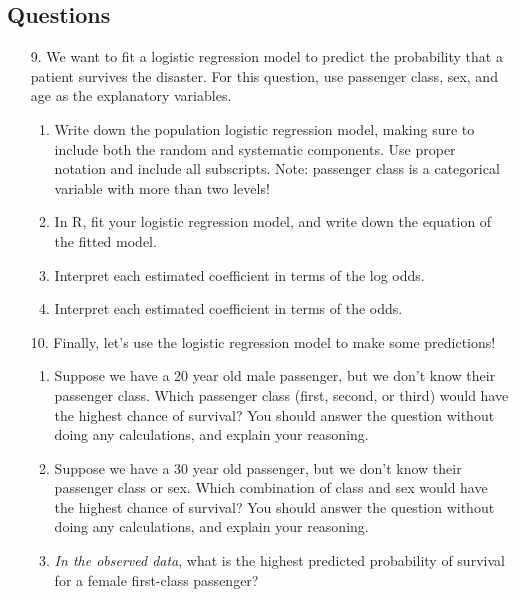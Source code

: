 \documentclass[11pt]{article}
\begin{document}
\subsection*{Questions}

\begin{enumerate}
\item[9.] We want to fit a logistic regression model to predict the probability that a patient survives the disaster. For this question, use passenger class, sex, and age as the explanatory variables.

\begin{enumerate}
\item Write down the population logistic regression model, making sure to include both the random and systematic components. Use proper notation and include all subscripts. Note: passenger class is a categorical variable with more than two levels! 

\item In R, fit your logistic regression model, and write down the equation of the fitted model.

\item Interpret each estimated coefficient in terms of the log odds.

\item Interpret each estimated coefficient in terms of the odds.
\end{enumerate}

\item[10.] Finally, let's use the logistic regression model to make some predictions!

\begin{enumerate}
\item Suppose we have a 20 year old male passenger, but we don't know their passenger class. Which passenger class (first, second, or third) would have the highest chance of survival? You should answer the question without doing any calculations, and explain your reasoning.

\item Suppose we have a 30 year old passenger, but we don't know their passenger class or sex. Which combination of class and sex would have the highest chance of survival? You should answer the question without doing any calculations, and explain your reasoning.

\item \textit{In the observed data}, what is the highest predicted probability of survival for a female first-class passenger?

\end{enumerate}
\end{enumerate}
\end{document}

